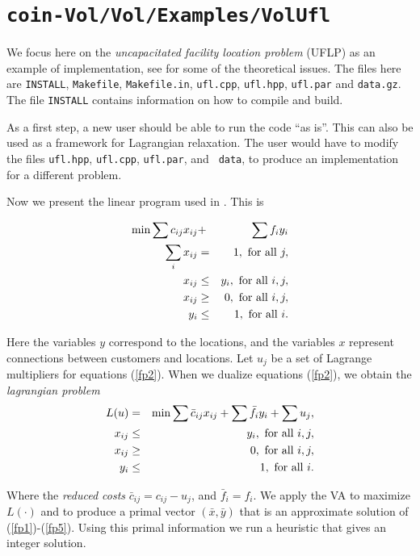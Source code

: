 \documentclass{article}
\begin{document}
\section{{\tt coin-Vol/Vol/Examples/VolUfl}}
We focus here on the {\it uncapacitated facility location
problem} (UFLP) as an example of implementation, see \cite{BC} for some of the theoretical
issues. The files here are {\tt INSTALL}, {\tt Makefile}, {\tt Makefile.in}, 
{\tt ufl.cpp}, {\tt ufl.hpp}, {\tt ufl.par} and {\tt data.gz}.
The file {\tt INSTALL} contains information on how to compile and build.

As a first step, a new user should be able to run the code ``as is''.
This can also be used as a framework for Lagrangian relaxation. The user would
have to modify the files {\tt ufl.hpp}, {\tt ufl.cpp}, {\tt ufl.par}, and {\tt
data}, to produce an implementation for a different problem.


Now we present the linear program used in \cite{BC}. This is

\pagebreak[4]
\begin{eqnarray}
\min \sum c_{ij} x_{ij} & + & \sum f_i y_i  \label{fp1} \\
\sum_i x_{ij} & = & 1, \hbox{ for all } j,  \label{fp2} \\
x_{ij} & \leq & y_i, \hbox{ for all } i, j, \label{fp3} \\
x_{ij} & \ge  & 0, \hbox{ for all } i, j,   \label{fp4} \\ 
y_i    & \le  & 1, \hbox{ for all } i.      \label{fp5}
\end{eqnarray}

Here the variables $y$ correspond to the locations, and the variables $x$
represent connections between customers and locations. Let $u_j$ be a set of
Lagrange multipliers for equations (\ref{fp2}). When we dualize equations
(\ref{fp2}), we obtain the {\it lagrangian problem}
\begin{eqnarray*}
L(u) & = & \min \sum \bar c_{ij} x_{ij} + \sum \bar f_i y_i + \sum u_j, \\
x_{ij} & \le & y_i, \hbox{ for all } i, j, \\
x_{ij} & \ge & 0, \hbox{ for all } i, j, \\
y_i    & \le & 1, \hbox{ for all } i.
\end{eqnarray*}

\noindent Where the {\it reduced costs} $\bar c_{ij}=c_{ij}-u_j$, and
$\bar f_i = f_i$. We apply the VA to maximize $L(\cdot)$ and to produce a
primal vector $(\bar x, \bar y)$ that is an approximate solution of
(\ref{fp1})-(\ref{fp5}). Using this primal information we run a heuristic
that gives an integer solution.
\end{document}
